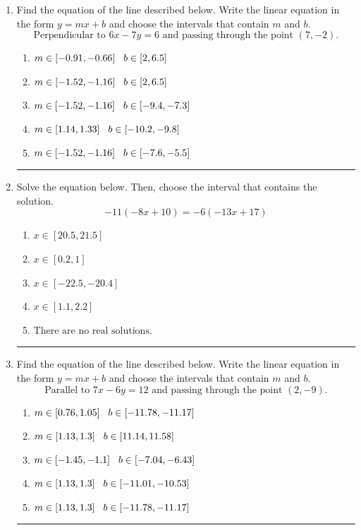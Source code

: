 \documentclass[14pt]{extbook}
\newcommand{\litem}[1]{\item#1\hspace*{-1cm}\rule{\textwidth}{0.4pt}}
\begin{document}
\begin{enumerate}
{\begin{enumerate}[label=\Alph*.]
\end{enumerate} }
\litem{
Find the equation of the line described below. Write the linear equation in the form $ y=mx+b $ and choose the intervals that contain $m$ and $b$.\[ \text{Perpendicular to } 6 x - 7 y = 6 \text{ and passing through the point } (7, -2). \]\begin{enumerate}[label=\Alph*.]
\item \( m \in [-0.91, -0.66] \hspace*{3mm} b \in [2, 6.5] \)
\item \( m \in [-1.52, -1.16] \hspace*{3mm} b \in [2, 6.5] \)
\item \( m \in [-1.52, -1.16] \hspace*{3mm} b \in [-9.4, -7.3] \)
\item \( m \in [1.14, 1.33] \hspace*{3mm} b \in [-10.2, -9.8] \)
\item \( m \in [-1.52, -1.16] \hspace*{3mm} b \in [-7.6, -5.5] \)

\end{enumerate} }
\litem{
Solve the equation below. Then, choose the interval that contains the solution.\[ -11(-8x + 10) = -6(-13x + 17) \]\begin{enumerate}[label=\Alph*.]
\item \( x \in [20.5, 21.5] \)
\item \( x \in [0.2, 1] \)
\item \( x \in [-22.5, -20.4] \)
\item \( x \in [1.1, 2.2] \)
\item \( \text{There are no real solutions.} \)

\end{enumerate} }
\litem{
Find the equation of the line described below. Write the linear equation in the form $ y=mx+b $ and choose the intervals that contain $m$ and $b$.\[ \text{Parallel to } 7 x - 6 y = 12 \text{ and passing through the point } (2, -9). \]\begin{enumerate}[label=\Alph*.]
\item \( m \in [0.76, 1.05] \hspace*{3mm} b \in [-11.78, -11.17] \)
\item \( m \in [1.13, 1.3] \hspace*{3mm} b \in [11.14, 11.58] \)
\item \( m \in [-1.45, -1.1] \hspace*{3mm} b \in [-7.04, -6.43] \)
\item \( m \in [1.13, 1.3] \hspace*{3mm} b \in [-11.01, -10.53] \)
\item \( m \in [1.13, 1.3] \hspace*{3mm} b \in [-11.78, -11.17] \)


\end{enumerate}}
\end{enumerate}
\end{document}
